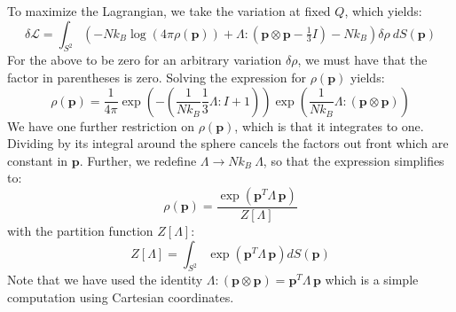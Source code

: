 \documentclass[reqno]{article}
\begin{document}
  To maximize the Lagrangian, we take the variation at fixed $Q$, which yields:
  \begin{equation}
    \delta \mathcal{L}
    =
    \int_{S^2} \left(
      -N k_B \log \left( 4 \pi \rho(\mathbf{p}) \right)
      + \Lambda : (\mathbf{p} \otimes \mathbf{p} - \tfrac13 I)
      - N k_B
    \right) \delta \rho \: dS(\mathbf{p})
  \end{equation}
  For the above to be zero for an arbitrary variation $\delta \rho$, we must have
  that the factor in parentheses is zero.
  Solving the expression for $\rho(\mathbf{p})$ yields:
  \begin{equation}
    \rho(\mathbf{p})
    =
    \frac{1}{4\pi}
    \exp \left(
      -\left(\frac{1}{N k_B} \frac13 \Lambda : I + 1\right)
    \right)
    \exp \left(
      \frac{1}{N k_B} \Lambda : (\mathbf{p} \otimes \mathbf{p})
    \right)
  \end{equation}
  We have one further restriction on $\rho(\mathbf{p})$, which is that it integrates to
  one.
  Dividing by its integral around the sphere cancels the factors out front which
  are constant in $\mathbf{p}$.
  Further, we redefine $\Lambda \to N k_B \: \Lambda$, so that the expression
  simplifies to:
  \begin{equation}
    \rho(\mathbf{p})
    =
    \frac{\exp \left( \mathbf{p}^T \Lambda \, \mathbf{p} \right)}{Z[\Lambda]}
  \end{equation}
  with the partition function $Z[\Lambda]$:
  \begin{equation}
    Z[\Lambda] = \int_{S^2} \exp \left( \mathbf{p}^T \Lambda \, \mathbf{p} \right) dS(\mathbf{p})
  \end{equation}
  Note that we have used the identity $\Lambda : (\mathbf{p} \otimes \mathbf{p}) = \mathbf{p}^T
  \Lambda \, \mathbf{p}$ which is a simple computation using Cartesian coordinates.
\end{document}
